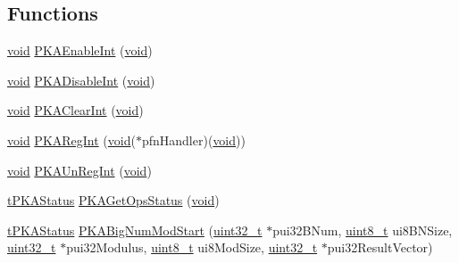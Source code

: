 \subsection*{Functions}
\begin{DoxyCompactItemize}
\item 
\hyperlink{usb__devapi_8h_afabf60e7f57651d6d595a02c75f07cd0}{void} \hyperlink{group__pka__driver_gaed47ea15b15663675629b0e0388afede}{P\+K\+A\+Enable\+Int} (\hyperlink{usb__devapi_8h_afabf60e7f57651d6d595a02c75f07cd0}{void})
\item 
\hyperlink{usb__devapi_8h_afabf60e7f57651d6d595a02c75f07cd0}{void} \hyperlink{group__pka__driver_ga332c572585f555dc982817a355284f70}{P\+K\+A\+Disable\+Int} (\hyperlink{usb__devapi_8h_afabf60e7f57651d6d595a02c75f07cd0}{void})
\item 
\hyperlink{usb__devapi_8h_afabf60e7f57651d6d595a02c75f07cd0}{void} \hyperlink{group__pka__driver_gaac0d2e55a0331401d91eb645e043d333}{P\+K\+A\+Clear\+Int} (\hyperlink{usb__devapi_8h_afabf60e7f57651d6d595a02c75f07cd0}{void})
\item 
\hyperlink{usb__devapi_8h_afabf60e7f57651d6d595a02c75f07cd0}{void} \hyperlink{group__pka__driver_ga8e873132638c12c2ac9fca35a36013d6}{P\+K\+A\+Reg\+Int} (\hyperlink{usb__devapi_8h_afabf60e7f57651d6d595a02c75f07cd0}{void}($\ast$pfn\+Handler)(\hyperlink{usb__devapi_8h_afabf60e7f57651d6d595a02c75f07cd0}{void}))
\item 
\hyperlink{usb__devapi_8h_afabf60e7f57651d6d595a02c75f07cd0}{void} \hyperlink{group__pka__driver_ga2d21625a6c77aee8721066476a68275d}{P\+K\+A\+Un\+Reg\+Int} (\hyperlink{usb__devapi_8h_afabf60e7f57651d6d595a02c75f07cd0}{void})
\item 
\hyperlink{pka_8h_a94af1eb5fa0257508f865b5e40de4ed3}{t\+P\+K\+A\+Status} \hyperlink{group__pka__driver_ga82d30b6e54d4e06c2fd871dbefbf90c5}{P\+K\+A\+Get\+Ops\+Status} (\hyperlink{usb__devapi_8h_afabf60e7f57651d6d595a02c75f07cd0}{void})
\item 
\hyperlink{pka_8h_a94af1eb5fa0257508f865b5e40de4ed3}{t\+P\+K\+A\+Status} \hyperlink{group__pka__driver_gadcb3179ff4f5d836e35d9b4505220787}{P\+K\+A\+Big\+Num\+Mod\+Start} (\hyperlink{_p_e___types_8h_a33594304e786b158f3fb30289278f5af}{uint32\+\_\+t} $\ast$pui32\+B\+Num, \hyperlink{_p_e___types_8h_aba7bc1797add20fe3efdf37ced1182c5}{uint8\+\_\+t} ui8\+B\+N\+Size, \hyperlink{_p_e___types_8h_a33594304e786b158f3fb30289278f5af}{uint32\+\_\+t} $\ast$pui32\+Modulus, \hyperlink{_p_e___types_8h_aba7bc1797add20fe3efdf37ced1182c5}{uint8\+\_\+t} ui8\+Mod\+Size, \hyperlink{_p_e___types_8h_a33594304e786b158f3fb30289278f5af}{uint32\+\_\+t} $\ast$pui32\+Result\+Vector)

\end{DoxyCompactItemize}
